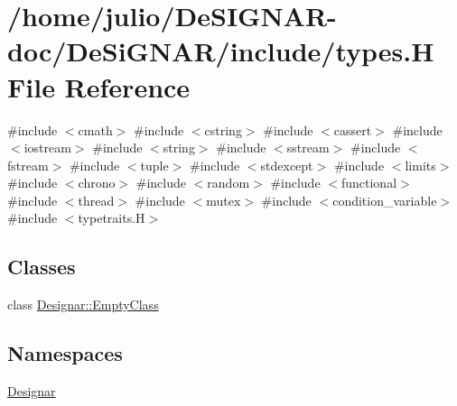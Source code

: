 \hypertarget{types_8_h}{}\section{/home/julio/\+De\+S\+I\+G\+N\+A\+R-\/doc/\+De\+Si\+G\+N\+A\+R/include/types.H File Reference}
\label{types_8_h}
{\ttfamily \#include $<$cmath$>$}\newline
{\ttfamily \#include $<$cstring$>$}\newline
{\ttfamily \#include $<$cassert$>$}\newline
{\ttfamily \#include $<$iostream$>$}\newline
{\ttfamily \#include $<$string$>$}\newline
{\ttfamily \#include $<$sstream$>$}\newline
{\ttfamily \#include $<$fstream$>$}\newline
{\ttfamily \#include $<$tuple$>$}\newline
{\ttfamily \#include $<$stdexcept$>$}\newline
{\ttfamily \#include $<$limits$>$}\newline
{\ttfamily \#include $<$chrono$>$}\newline
{\ttfamily \#include $<$random$>$}\newline
{\ttfamily \#include $<$functional$>$}\newline
{\ttfamily \#include $<$thread$>$}\newline
{\ttfamily \#include $<$mutex$>$}\newline
{\ttfamily \#include $<$condition\+\_\+variable$>$}\newline
{\ttfamily \#include $<$typetraits.\+H$>$}\newline
\subsection*{Classes}
\begin{DoxyCompactItemize}
\item 
class \hyperlink{class_designar_1_1_empty_class}{Designar\+::\+Empty\+Class}
\end{DoxyCompactItemize}
\subsection*{Namespaces}
\begin{DoxyCompactItemize}
\item 
 \hyperlink{namespace_designar}{Designar}
\end{DoxyCompactItemize}
